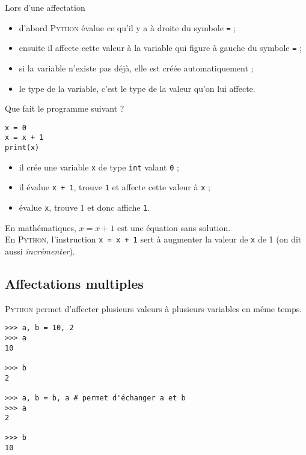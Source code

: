 \begin{definition}[ : affectation]
	Lors d'une affectation
	\begin{itemize}
		\item d'abord \textsc{Python} évalue ce qu'il y a à droite du symbole \texttt{=} ;
		\item ensuite il affecte cette valeur à la variable qui figure à gauche du symbole \texttt{=} ;
		\item si la variable n'existe pas déjà, elle est créée automatiquement ;
		\item le type de la variable, c'est le type de la valeur qu'on lui affecte.
	\end{itemize}
\end{definition}
Que fait le programme suivant ?

\begin{pyc}
	\begin{verbatim}
x = 0
x = x + 1
print(x)    
\end{verbatim}
\end{pyc}

\begin{itemize}
	\item il crée une variable \texttt{x} de type \texttt{int} valant \texttt{0} ;
	\item il évalue \texttt{x + 1}, trouve \texttt{1} et affecte cette valeur à \texttt{x} ;
	\item évalue \texttt{x}, trouve 1 et donc affiche \texttt{1}.
\end{itemize}

\begin{aretenir}
	En mathématiques, $x = x + 1$ est une équation sans solution.\\

	En \textsc{Python}, l'instruction \texttt{x = x + 1} sert à augmenter la valeur de \texttt{x} de 1 (on dit aussi \textit{incrémenter}).
\end{aretenir}

\subsection{Affectations multiples}
\textsc{Python} permet d'affecter plusieurs valeurs à plusieurs variables en même temps.

\begin{pyc}\begin{verbatim}
>>> a, b = 10, 2
>>> a
10

>>> b
2

>>> a, b = b, a # permet d'échanger a et b
>>> a
2

>>> b
10

\end{verbatim}
\end{pyc}

